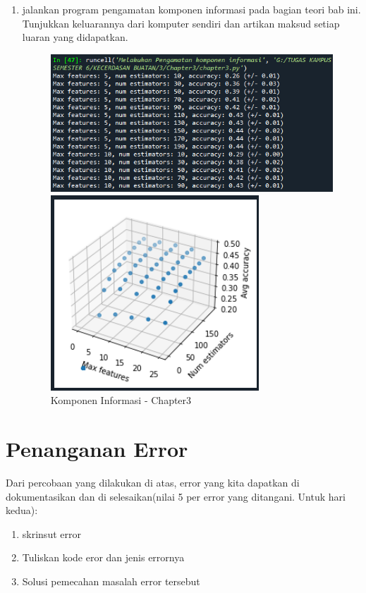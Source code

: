 \begin{enumerate}
    \item jalankan program pengamatan komponen informasi pada bagian teori bab ini. Tunjukkan keluarannya dari komputer sendiri dan artikan maksud setiap luaran yang didapatkan.
    \begin{figure}[ht]
        \centerline{\includegraphics[scale=0.7]{figures/chapter3-8.png}}
        \centerline{\includegraphics[scale=1.3]{figures/chapter3-8a.png}}
        \caption{Komponen Informasi - Chapter3}
        \label{Komponen Informasi - Chapter3}
    \end{figure}
\end{enumerate}


\section{Penanganan Error}
Dari percobaan yang dilakukan di atas, error yang kita dapatkan di dokumentasikan dan di selesaikan(nilai 5 per error yang ditangani. Untuk hari kedua):

\begin{enumerate}
    \item skrinsut error
    \item Tuliskan kode eror dan jenis errornya
    \item Solusi pemecahan masalah error tersebut
\end{enumerate}

